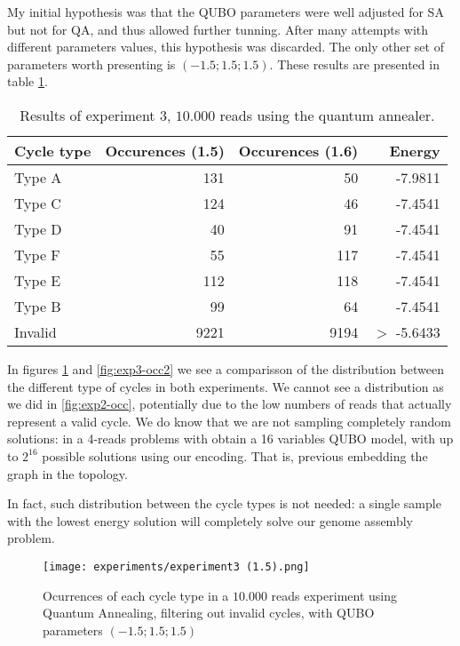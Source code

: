 My initial hypothesis was that the QUBO parameters were well adjusted for SA but not for QA, and thus allowed further tunning. After many attempts with different parameters values, this hypothesis was discarded. The only other set of parameters worth presenting is $(-1.5; 1.5; 1.5)$. These results are presented in table \ref{tab:exp3}.

\begin{table}[H]
	\centering
	\begin{tabular}{lrrr}
		\textbf{Cycle type} & \textbf{Occurences (1.5)} & \textbf{Occurences (1.6)} & \textbf{Energy} \\
		\hline
		Type A	& 131	& 50	& -7.9811	\\
		Type C	& 124	& 46	& -7.4541	\\
		Type D	& 40	& 91	& -7.4541	\\
		Type F	& 55	& 117	& -7.4541	\\
		Type E	& 112	& 118	& -7.4541	\\
		Type B	& 99	& 64	& -7.4541	\\    
		Invalid & 9221	& 9194	& $>$ -5.6433                         
	\end{tabular}
	\caption{Results of experiment 3, $10.000$ reads using the quantum annealer.}
	\label{tab:exp3}
\end{table}

In figures \ref{fig:exp3-occ1} and \ref{fig:exp3-occ2} we see a comparisson of the distribution between the different type of cycles in both experiments. We cannot see a distribution as we did in \ref{fig:exp2-occ}, potentially due to the low numbers of reads that actually represent a valid cycle. We do know that we are not sampling completely random solutions: in a 4-reads problems with obtain a 16 variables QUBO model, with up to $2^{16}$ possible solutions using our encoding. That is, previous embedding the graph in the topology.

In fact, such distribution between the cycle types is not needed: a single sample with the lowest energy solution will completely solve our genome assembly problem.

\begin{figure}[H]
	\texttt{[image: experiments/experiment3 (1.5).png]}
	\centering
	\caption{Ocurrences of each cycle type in a $10.000$ reads experiment using Quantum Annealing, filtering out invalid cycles, with QUBO parameters $(-1.5; 1.5; 1.5)$}
	\label{fig:exp3-occ1}
\end{figure}

